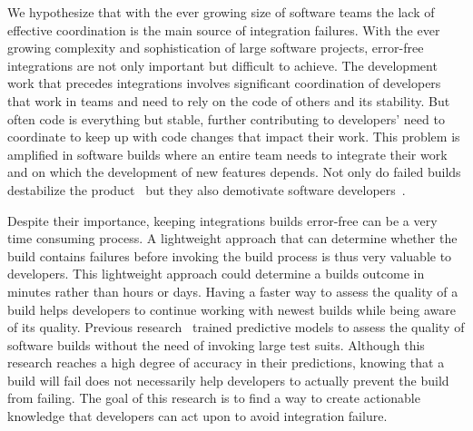 \documentclass[12pt,oneside]{book}
\begin{document}

We hypothesize that with the ever growing size of software teams the lack of
effective coordination is the main source of integration failures.  With the
ever growing complexity and sophistication of large software projects,
error-free integrations are not only important but difficult to achieve. The
development work that precedes integrations involves significant coordination of
developers that work in teams and need to rely on the code of others and its
stability. But often code is everything but stable, further contributing to
developers' need to coordinate to keep up with code changes that impact their work. This problem is
amplified in software builds where an entire team needs to integrate their work
and on which the development of new features depends. Not only do
failed builds destabilize the product~\cite{cusumano1997} but they also demotivate
software developers~\cite{holck2004}.

Despite their importance, keeping integrations builds error-free can be a very time consuming
process. A lightweight approach that can determine whether the build contains
failures before invoking the build process is thus very valuable to developers.
This lightweight approach could determine a builds outcome in minutes rather than hours or days. Having a faster way to
assess the quality of a build helps developers to continue working with newest
builds while being aware of its quality. Previous
research~\cite{wolf:icse:2009,hassan:ase:2006} trained predictive models to assess the quality of software builds without the need of invoking large test
suits. Although this research
reaches a high degree of accuracy in their predictions, knowing that a
build will fail does not necessarily help developers to actually prevent
the build from failing.
The goal of this research is to find a way to create actionable knowledge that
developers can act upon to avoid
integration failure.
\end{document}

